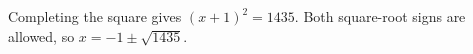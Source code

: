 Completing the square gives $(x+1)^2=1435$. Both square-root signs are allowed, so $\boxed{x=-1\pm\sqrt{1435}}$.
